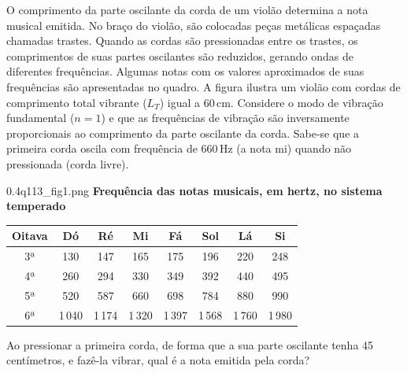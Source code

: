 O comprimento da parte oscilante da corda de um violão determina a nota musical emitida. No braço do violão, são colocadas peças metálicas espaçadas chamadas trastes. Quando as cordas são pressionadas entre os trastes, os comprimentos de suas partes oscilantes são reduzidos, gerando ondas de diferentes frequências. Algumas notas com os valores aproximados de suas frequências são apresentadas no quadro. A figura ilustra um violão com cordas de comprimento total vibrante ($L_T$) igual a 60\,cm. Considere o modo de vibração fundamental ($n = 1$) e que as frequências de vibração são inversamente proporcionais ao comprimento da parte oscilante da corda. Sabe-se que a primeira corda oscila com frequência de 660\,Hz (a nota mi) quando não pressionada (corda livre).\par
\begin{figlado}{0.4}{q113_fig1.png}
\textbf{Frequência das notas musicais, em hertz, no sistema temperado}\par
\begin{center}\renewcommand{\arraystretch}{1.15}
\begin{tabular}{cccccccc}
\toprule
\textbf{Oitava} & \textbf{Dó} & \textbf{Ré} & \textbf{Mi} & \textbf{Fá} & \textbf{Sol} & \textbf{Lá} & \textbf{Si}\\
\midrule
3ª & 130 & 147 & 165 & 175 & 196 & 220 & 248\\
4ª & 260 & 294 & 330 & 349 & 392 & 440 & 495\\
5ª & 520 & 587 & 660 & 698 & 784 & 880 & 990\\
6ª & 1\,040 & 1\,174 & 1\,320 & 1\,397 & 1\,568 & 1\,760 & 1\,980\\
\bottomrule
\end{tabular}\end{center}
\end{figlado}
Ao pressionar a primeira corda, de forma que a sua parte oscilante tenha 45 centímetros, e fazê-la vibrar, qual é a nota emitida pela corda?\par
\begin{altlinha}
%
%
%
%
\end{altlinha}
